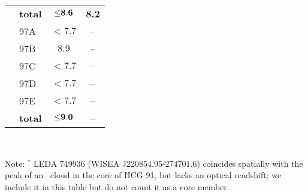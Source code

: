 \begin{table}
\begin{center}
\begin{tabular}{l l c c}
 & {\bf total} & ${\bf {\leq}8.6}$ & {\bf 8.2}\\ 
\rule{0pt}{10pt}
 \multirow{6}{*}{97} & 97A & ${<}7.7$ & --\\ 
 & 97B & ${}8.9$ & -- \\ 
 & 97C & ${<}7.7$ & -- \\ 
 & 97D & ${<}7.7$ & -- \\ 
 & 97E & ${<}7.7$ & -- \\ 
 & {\bf total} & ${\bf {\leq}9.0}$ & {\bf --}\\ 
\hline
\end{tabular} \\ 
\rule{0pt}{10pt}
Note: $^*$ LEDA 749936 (WISEA J220854.95-274701.6) coincides spatially with the peak of an \hi\ cloud in the core of HCG 91, but lacks an optical readshift; we include it in this table but do not count it as a core member.
\end{center} 
\end{table}
